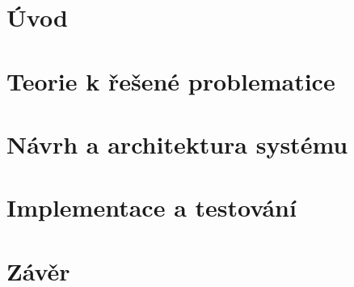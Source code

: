 \documentclass[12pt,a4paper,oneside]{article}
\begin{document}
\tableofcontents

\newpage
\section{Úvod}

\clearpage
\section{Teorie k řešené problematice}




\clearpage
\section{Návrh a architektura systému}





\clearpage
\section{Implementace a testování}\label{sec:implementace}


\section{Závěr}
\end{document}

